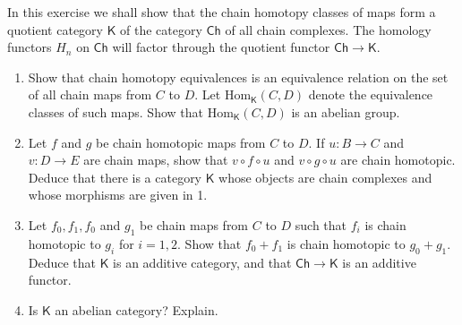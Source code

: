 \begin{exer} In this exercise we shall show that the chain homotopy classes of maps form a quotient category $\mathsf{K}$ of the category $\mathsf{Ch}$ of all chain complexes. The homology functors $H_n$ on $\mathsf{Ch}$ will factor through the quotient functor $\mathsf{Ch}\rightarrow \mathsf{K}$.
\begin{enumerate}
\item Show that chain homotopy equivalences is an equivalence relation on the set of all chain maps from $C$ to $D$. Let $\textrm{Hom}_{\mathsf{K}}(C,D)$ denote the equivalence classes of such maps. Show that $\textrm{Hom}_{\mathsf{K}}(C,D)$ is an abelian group.
\item Let $f$ and $g$ be chain homotopic maps from $C$ to $D$. If $u:B\rightarrow C$ and $v:D\rightarrow E$ are chain maps, show that $v\circ f\circ u$ and $v\circ g\circ u$ are chain homotopic. Deduce that there is a category $\mathsf{K}$ whose objects are chain complexes and whose morphisms are given in 1.
\item Let $f_0,f_1,f_0$ and $g_1$ be chain maps from $C$ to $D$ such that $f_i$ is chain homotopic to $g_i$ for $i=1,2$. Show that $f_0+f_1$ is chain homotopic to $g_0+g_1$. Deduce that $\mathsf{K}$ is an additive category, and that $\mathsf{Ch}\rightarrow \mathsf{K}$ is an additive functor.
\item Is $\mathsf{K}$ an abelian category? Explain.
\end{enumerate}
\end{exer}

